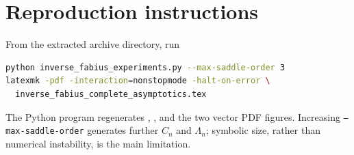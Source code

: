 \documentclass[11pt,oneside]{article}
\numberwithin{equation}{section}
\theoremstyle{definition}
\theoremstyle{remark}
\begin{document}
\section{Reproduction instructions}
\label{app:reproduction}

From the extracted archive directory, run
\begin{lstlisting}[language=bash]
python inverse_fabius_experiments.py --max-saddle-order 3
latexmk -pdf -interaction=nonstopmode -halt-on-error \
  inverse_fabius_complete_asymptotics.tex
\end{lstlisting}
The Python program regenerates
, , and the two
vector PDF figures.  Increasing \texttt{--max-saddle-order} generates further
$C_n$ and $\Lambda_n$; symbolic size, rather than numerical instability, is
the main limitation.
\end{document}
